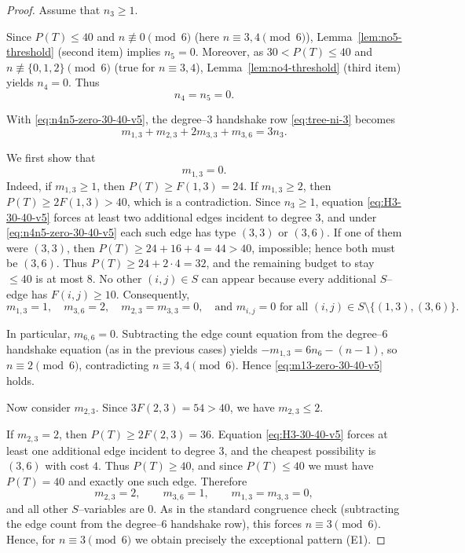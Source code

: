 \documentclass[preprint,12pt]{elsarticle}
\begin{document}
\begin{proof}
Assume that $n_3\ge 1$.

\medskip
Since $P(T)\le 40$ and $n\not\equiv 0\pmod 6$ (here $n\equiv 3,4\pmod 6$),
Lemma~\ref{lem:no5-threshold} (second item) implies $n_5=0$.
Moreover, as $30<P(T)\le 40$ and $n\not\equiv\{0,1,2\}\pmod 6$ (true for $n\equiv 3,4$),
Lemma~\ref{lem:no4-threshold} (third item) yields $n_4=0$.
Thus
\begin{equation}
n_4=n_5=0.
\label{eq:n4n5-zero-30-40-v5}
\end{equation}

With \eqref{eq:n4n5-zero-30-40-v5}, the degree--$3$ handshake row \eqref{eq:tree-ni-3} becomes
\begin{equation}
m_{1,3}+m_{2,3}+2m_{3,3}+m_{3,6}=3n_3.
\label{eq:H3-30-40-v5}
\end{equation}

\medskip
We first show that
\begin{equation}
m_{1,3}=0.
\label{eq:m13-zero-30-40-v5}
\end{equation}
Indeed, if $m_{1,3}\ge 1$, then $P(T)\ge F(1,3)=24$. If $m_{1,3}\ge 2$, then $P(T)\ge 2F(1,3)>40$, which is a contradiction.
Since $n_3\ge 1$, equation \eqref{eq:H3-30-40-v5} forces at least two additional edges incident to
degree $3$, and under \eqref{eq:n4n5-zero-30-40-v5} each such edge has type $(3,3)$ or $(3,6)$.
If one of them were $(3,3)$, then $P(T)\ge 24+16+4=44>40$, impossible; hence both must be $(3,6)$.
Thus $P(T)\ge 24+2\cdot 4=32$, and the remaining budget to stay $\le 40$ is at most $8$.
No other $(i,j)\in S$ can appear because every additional $S$--edge has $F(i,j)\ge 10$.
Consequently,
\[
m_{1,3}=1,\quad m_{3,6}=2,\quad m_{2,3}=m_{3,3}=0,
\quad\text{and } m_{i,j}=0 \text{ for all }(i,j)\in S\setminus\{(1,3),(3,6)\}.
\]

In particular, $m_{6,6}=0$. Subtracting the edge count equation from the degree–$6$ handshake equation (as in the previous cases) yields $-m_{1,3}=6n_6-(n-1)$, so $n\equiv 2\pmod 6$,
contradicting $n\equiv 3,4\pmod 6$. Hence \eqref{eq:m13-zero-30-40-v5} holds.

\medskip
Now consider $m_{2,3}$.
Since $3F(2,3)=54>40$, we have $m_{2,3}\le 2$.

If $m_{2,3}=2$, then $P(T)\ge 2F(2,3)=36$.
Equation \eqref{eq:H3-30-40-v5} forces at least one additional edge incident to degree $3$,
and the cheapest possibility is $(3,6)$ with cost $4$.
Thus $P(T)\ge 40$, and since $P(T)\le 40$ we must have $P(T)=40$ and exactly one such edge.
Therefore
\[
m_{2,3}=2,\qquad m_{3,6}=1,\qquad m_{1,3}=m_{3,3}=0,
\]
and all other $S$--variables are $0$.
As in the standard congruence check (subtracting the edge count from the degree--$6$ handshake row),
this forces $n\equiv 3\pmod 6$.
Hence, for $n\equiv 3\pmod 6$ we obtain precisely the exceptional pattern \textup{(E1)}.


\end{proof}
\end{document}
